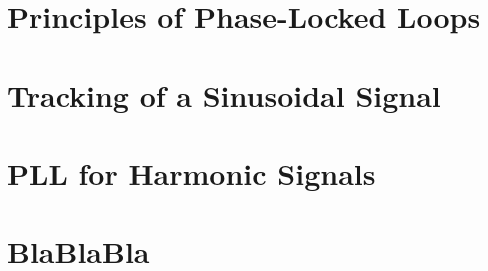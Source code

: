 \documentclass[11pt,a4paper,twoside]{report}
\begin{document}
\fancyhead[LO]{\scshape \listtablename}
\fancyhead[RE]{\scshape \listtablename}
\listoftables
\cleardoublepage

\setcounter{chapter}{0}
\setcounter{figure}{0}
\fancyhead[LO]{\rightmark}
\fancyhead[RO]{\scshape \chaptername\ \thechapter}
\fancyhead[LE]{\scshape \chaptername\ \thechapter}
\fancyhead[RE]{\textsc{\leftmark}}


\chapter{Principles of Phase-Locked Loops}


\chapter{Tracking of a Sinusoidal Signal}


\chapter{PLL for Harmonic Signals}


\chapter{BlaBlaBla}






\fancyhead[LO]{\scshape\bibname}
\fancyhead[RO]{\scshape\appendixname}
\fancyhead[LE]{\scshape\appendixname}
\fancyhead[RE]{\scshape\bibname}



\end{document}
